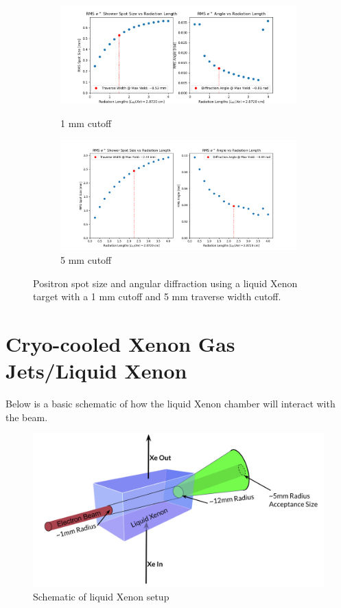 \documentclass[%
reprint,
amsmath, amssymb,
aps,
floatfix,
]{revtex4-2}
\begin{document}
\begin{figure}[H]
    \begin{subfigure}{.5\textwidth}
        \includegraphics[height = .455\linewidth]{../images/XeATW1mmCutoff.png}
        \caption{\label{fig:XeATW1}1 mm cutoff}
        \includegraphics[height = .5\linewidth]{../images/XeATW5mmCutoff.png}
        \caption{\label{fig:XeATW5}5 mm cutoff}
    \end{subfigure}
    \caption{\label{fig:ATWCut}Positron spot size and angular diffraction using 
    a liquid Xenon target with a 1 mm cutoff and 5 mm traverse width cutoff.}
\end{figure}

\section{Cryo-cooled Xenon Gas Jets/Liquid Xenon}
Below is a basic schematic of how the liquid Xenon chamber will interact with the beam.
\begin{figure}[H]
    \includegraphics[width = .5\textwidth]{../images/Schematic.png}
    \caption{\label{fig:schem}Schematic of liquid Xenon setup}
\end{figure}
\end{document}
